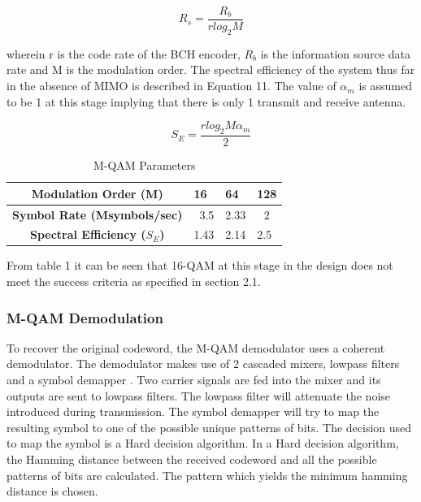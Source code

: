 \documentclass[pdftex,11pt,a4paper]{article}
\begin{document}
\begin{equation}
	R_s = \frac{R_b}{rlog_{2}M}
\end{equation}

wherein r is the code rate of the BCH encoder, \(R_b\) is the information source data rate and M is the modulation order. The spectral efficiency of the system thus far in the absence of MIMO is described in Equation 11. The value of \(\alpha_m\) is assumed to be 1 at this stage implying that there is only 1 transmit and receive antenna.

\begin{equation}
	S_E = \frac{rlog_{2}M\alpha_m}{2} 
\end{equation}

\begin{table}[]
	\centering
	\caption{M-QAM Parameters}
	\label{1}
	\begin{tabular}{|c|l|l|l|}
		\hline
		\textbf{Modulation Order (M)}       & 16                       & 64                        & 128                    \\ \hline
		\textbf{Symbol Rate (Msymbols/sec)} & \multicolumn{1}{r|}{3.5} & \multicolumn{1}{c|}{2.33} & \multicolumn{1}{c|}{2} \\ \hline
		\textbf{Spectral Efficiency ($S_E$)}  & 1.43                     & 2.14                      & 2.5                    \\ \hline
	\end{tabular}
\end{table}

From table 1 it can be seen that 16-QAM at this stage in the design does not meet the success criteria as specified in section 2.1.

\subsubsection{M-QAM Demodulation}
To recover the original codeword, the M-QAM demodulator uses a coherent demodulator. The demodulator makes use of 2 cascaded mixers, lowpass filters and a symbol demapper \cite{B15}. Two carrier  signals are fed into the mixer and its outputs are sent to lowpass filters. The lowpass filter will attenuate the noise introduced during transmission. The symbol demapper will try to map the resulting symbol to one of the possible unique patterns of bits. The decision used to map the symbol is a Hard decision algorithm. In a Hard decision algorithm, the Hamming distance between the received codeword and all the possible patterns of bits are calculated. The pattern which yields the minimum hamming distance is chosen.
\end{document}
